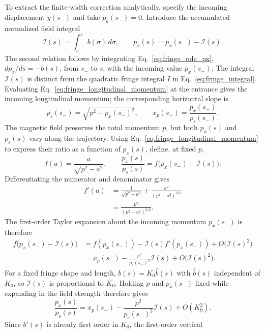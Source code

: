 To extract the finite-width correction analytically, specify the incoming
displacement $y(s_-)$ and take $p_y(s_-)=0$. Introduce the accumulated
normalized field integral
\begin{equation}
 \mathcal{I}(s)=\int_{s_-}^{s}b(\sigma)\,d\sigma,\qquad
 p_x(s)=p_x(s_-)-\mathcal{I}(s).
\end{equation}
The second relation follows by integrating
Eq.~\eqref{eq:fringe_ode_px}, $dp_x/ds=-b(s)$, from $s_-$ to $s$,
with the incoming value $p_x(s_-)$.
The integral $\mathcal{I}(s)$ is distinct from the quadratic
fringe integral $I$ in Eq.~\eqref{eq:fringe_integral}.
Evaluating Eq.~\eqref{eq:fringe_longitudinal_momentum} at the entrance gives
the incoming longitudinal momentum; the corresponding horizontal slope is
\begin{equation}
 p_s(s_-)=\sqrt{p^2-p_x(s_-)^2},\qquad x_p(s_-)=\frac{p_x(s_-)}{p_s(s_-)}.
\end{equation}
The magnetic field preserves the total momentum $p$, but both $p_x(s)$ and
$p_s(s)$ vary along the trajectory. Using
Eq.~\eqref{eq:fringe_longitudinal_momentum} to express their ratio as a
function of $p_x(s)$, define, at fixed $p$,
\begin{equation}
 f(a)=\frac{a}{\sqrt{p^2-a^2}},\qquad
 \frac{p_x(s)}{p_s(s)}=f\bigl(p_x(s_-)-\mathcal{I}(s)\bigr).
\end{equation}
Differentiating the numerator and denominator gives
\begin{align}
 f'(a)
 &=\frac{1}{\sqrt{p^2-a^2}}
   +\frac{a^2}{(p^2-a^2)^{3/2}}\\
 &=\frac{p^2}{(p^2-a^2)^{3/2}}.
\end{align}
The first-order Taylor expansion about the incoming momentum $p_x(s_-)$ is
therefore
\begin{align}
 f\bigl(p_x(s_-)-\mathcal{I}(s)\bigr)
 &=f(p_x(s_-))-\mathcal{I}(s)f'(p_x(s_-))
   +O\bigl(\mathcal{I}(s)^2\bigr)\\
 &=x_p(s_-)-\frac{p^2}{p_s(s_-)^3}\mathcal{I}(s)
   +O\bigl(\mathcal{I}(s)^2\bigr).
\end{align}
For a fixed fringe shape and length, $b(s)=K_0\widehat b(s)$ with
$\widehat b(s)$ independent of $K_0$, so $\mathcal{I}(s)$ is proportional to
$K_0$. Holding $p$ and $p_x(s_-)$ fixed while expanding in the field strength
therefore gives
\begin{equation}
 \frac{p_x(s)}{p_s(s)}
 =x_p(s_-)-\frac{p^2}{p_s(s_-)^3}\mathcal{I}(s)+O(K_0^2).
\end{equation}
Since $b'(s)$ is already first order in $K_0$, the first-order vertical
